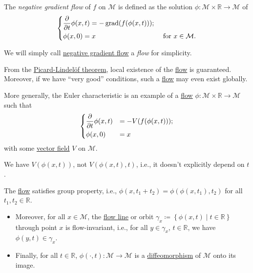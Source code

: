\begin{definition}\label{def:negative-gradient-flow}
	The \emph{negative gradient flow} of \(f\) on \(\mathcal{M} \) is defined as the solution \(\phi \colon \mathcal{M} \times \mathbb{R} \to \mathcal{M}\) of
	\[
		\begin{dcases}
			\frac{\partial }{\partial t} \phi (x, t) = -\mathop{\mathrm{grad}}(f(\phi (x, t))) ; \\
			\phi (x, 0)                              = x & \text{ for }x\in \mathcal{M} .
		\end{dcases}
	\]
\end{definition}

\begin{note}
	We will simply call \hyperref[def:negative-gradient-flow]{negative gradient flow} a \emph{flow} for simplicity.
\end{note}

\begin{remark}
	From the \href{https://en.wikipedia.org/wiki/Picard%E2%80%93Lindel%C3%B6f_theorem}{Picard-Lindelöf theorem}, local existence of the \hyperref[def:negative-gradient-flow]{flow} is guaranteed. Moreover, if we have ``very good'' conditions, such a \hyperref[def:negative-gradient-flow]{flow} may even exist globally.	
\end{remark}

More generally, the Euler characteristic is an example of a \hyperref[def:negative-gradient-flow]{flow} \(\phi \colon \mathcal{M} \times \mathbb{R} \to \mathcal{M} \) such that
\[
	\begin{dcases}
		\frac{\partial }{\partial t} \phi (x, t) & = -V(f(\phi (x, t))) ; \\
		\phi (x, 0)                              & = x
	\end{dcases}
\]
with some \hyperref[def:vector-field]{vector field} \(V\) on \(\mathcal{M} \).

\begin{note}[Autonomous]
	We have \(V(\phi (x, t))\), not \(V(\phi (x, t), t)\), i.e., it doesn't explicitly depend on \(t\).
\end{note}

\begin{remark}
	The \hyperref[def:negative-gradient-flow]{flow} satisfies group property, i.e., \(\phi (x, t_1 + t_2) = \phi (\phi (x, t_1), t_2)\) for all \(t_1, t_2\in \mathbb{R} \).
	\begin{itemize}
		\item Moreover, for all \(x\in \mathcal{M} \), the \hyperref[def:negative-gradient-flow]{flow line} or orbit \(\gamma _x \coloneqq \left\{ \phi (x, t) \mid t\in \mathbb{R}  \right\}\) through point \(x\) is flow-invariant, i.e., for all \(y\in \gamma _x\), \(t\in \mathbb{R} \), we have \(\phi (y, t)\in \gamma _x\).
		\item Finally, for all \(t\in \mathbb{R} \), \(\phi (\cdot, t) \colon \mathcal{M} \to \mathcal{M} \) is a \hyperref[def:diffeomorphism]{diffeomorphism} of \(\mathcal{M} \) onto its image.
	\end{itemize}
\end{remark}

